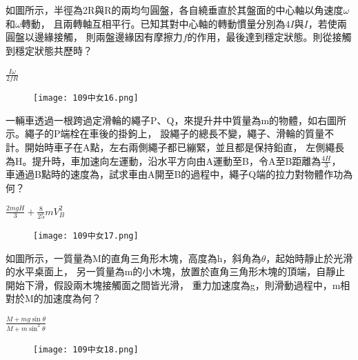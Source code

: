 \documentclass[cn,10pt,math=newtx,chinesefont=founder,device=ig]{elegantbook}
\begin{document}
\begin{example}
  如圖所示，半徑為2R與R的兩均勻圓盤，各自繞垂直於其盤面的中心軸以角速度$\omega$和$\omega$轉動，
  且兩轉軸互相平行。已知其對中心軸的轉動慣量分別為$4I$與$I$，若使兩圓盤以邊緣接觸，
  則兩盤邊緣因有摩擦力$f$的作用，最後達到穩定狀態。則從接觸到穩定狀態共歷時？\\
  \rightline{[台中女中教甄109]} 
\end{example}
\begin{solution}
  $\frac{I \omega}{2fR}$
\end{solution}
\begin{figure}[htbp]
  \flushright
  \texttt{[image: 109中女16.png]}
\end{figure}
\newpage

\begin{example}
  一輛車透過一根跨過定滑輪的繩子P、Q，來提升井中質量為m的物體，如右圖所示。繩子的P端栓在車後的掛鉤上，
  設繩子的總長不變，繩子、滑輪的質量不計。開始時車子在A點，左右兩側繩子都已繃緊，並且都是保持鉛直，
  左側繩長為H。提升時，車加速向左運動，沿水平方向由A運動至B，令A至B距離為$\frac{4H}{3}$，
  車通過B點時的速度為，試求車由A開至B的過程中，繩子Q端的拉力對物體作功為何？\\
  \rightline{[台中女中教甄109]} 
\end{example}
\begin{solution}
  $\frac{2mgH}{3}+\frac{8}{25}mV_{B}^2$
\end{solution}
\begin{figure}[htbp]
  \flushright
  \texttt{[image: 109中女17.png]}
\end{figure}
\newpage

\begin{example}
  如圖所示，一質量為M的直角三角形木塊，高度為h，斜角為$\theta$，起始時靜止於光滑的水平桌面上，
  另一質量為m的小木塊，放置於直角三角形木塊的頂端，自靜止開始下滑，假設兩木塊接觸面之間皆光滑，
  重力加速度為g，則滑動過程中，m相對於M的加速度為何？\\
  \rightline{[台中女中教甄109]} 
\end{example}
\begin{solution}
  $\frac{M+mg\sin\theta}{M+m\sin ^2 \theta}$
\end{solution}
\begin{figure}[htbp]
  \flushright
  \texttt{[image: 109中女18.png]}
\end{figure}
\newpage
\end{document}
